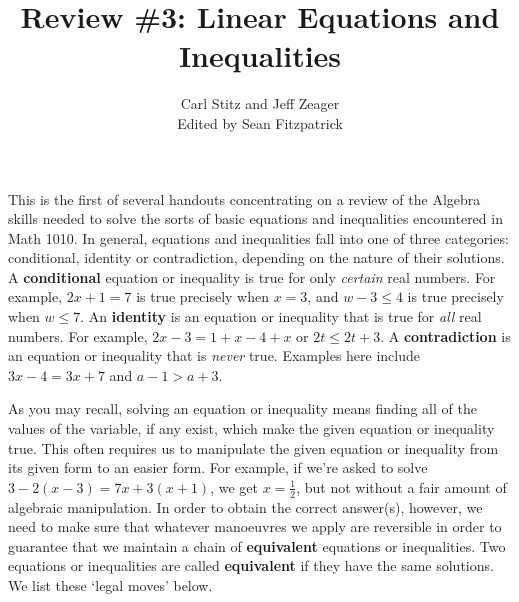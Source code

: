 \documentclass[11pt]{article}
\title{Review \#3: Linear Equations and Inequalities}
\author{Carl Stitz and Jeff Zeager\\
Edited by Sean Fitzpatrick}
\theoremstyle{definition}  %
\begin{document}
\maketitle


\renewcommand{\headrulewidth}{0pt}
\renewcommand{\headheight}{14pt}
\lhead[\fancyplain{}{\sc\thepage}]%
      {\fancyplain{}{\sc \nouppercase{\rightmark}}}
\rhead[\fancyplain{}{\sc \nouppercase{\leftmark}}]%
      {\fancyplain{}{\sc\thepage}}
\cfoot{}


This is the first of several handouts concentrating on a review of the Algebra skills needed to solve the sorts of basic equations and inequalities encountered in Math 1010.  In general, equations and inequalities fall into one of three categories:  conditional, identity or contradiction, depending on the nature of their solutions.  A \textbf{conditional} equation or inequality is true for only \textit{certain} real numbers.  For example, $2x+1 = 7$ is true precisely when $x = 3$, and $w - 3 \leq 4$ is true precisely when $w \leq 7$.  An \textbf{identity} is an equation or inequality that is true for \textit{all} real numbers.  For example, $2x -3 = 1+x-4+x$ or $2t \leq 2t + 3$.  A \textbf{contradiction} is an equation or inequality that is \textit{never} true.  Examples here include $3x - 4 = 3x + 7$ and $a - 1 > a + 3$.  

\smallskip

As you may recall, solving an equation or inequality means finding all of the values of the variable, if any exist, which make the given equation or inequality true.  This often requires us to manipulate the given equation or inequality from its given form to an easier form.  For example, if we're asked to solve $3 - 2(x-3) = 7x + 3(x+1)$, we get $x = \frac{1}{2}$, but not without a fair amount of algebraic manipulation. In order to obtain the correct answer(s), however, we need to make sure that whatever manoeuvres we apply are reversible in order to guarantee that we maintain a chain of \textbf{equivalent} equations or inequalities.  Two equations or inequalities are called \textbf{equivalent} if they have the same solutions.  We list these `legal moves' below.

\medskip

 \label{equivalenteqnineq}
\end{document}
